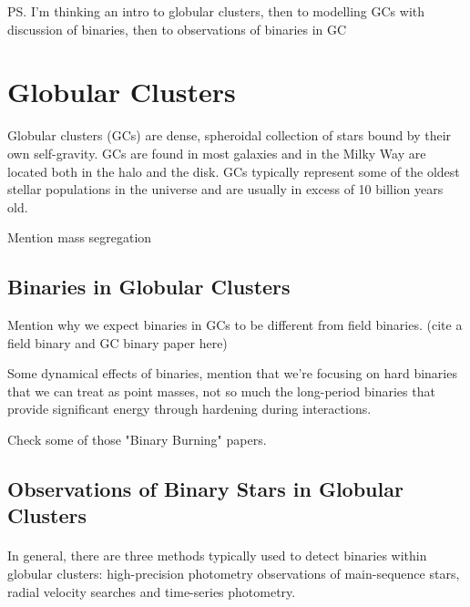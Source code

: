 \ps{I'm thinking an intro to globular clusters, then to modelling GCs with discussion of binaries,
	then to observations of binaries in GC}

\section{Globular Clusters}

Globular clusters (GCs) are dense, spheroidal collection of stars bound by their own self-gravity.
GCs are found in most galaxies and in the Milky Way are located both in the halo and the disk. GCs
typically represent some of the oldest stellar populations in the universe and are usually in excess
of 10 billion years old.

Mention mass segregation

\subsection{Binaries in Globular Clusters}

Mention why we expect binaries in GCs to be different from field binaries. (cite a field binary and GC binary paper here)

Some dynamical effects of binaries, mention that we're focusing on hard binaries that we can treat
as point masses, not so much the long-period binaries that provide significant energy through
hardening during interactions.

Check some of those "Binary Burning" papers.

\subsection{Observations of Binary Stars in Globular Clusters}

\paragraph{}
In general, there are three methods typically used to detect binaries within globular clusters:
high-precision photometry observations of main-sequence stars, radial velocity searches and
time-series photometry.

